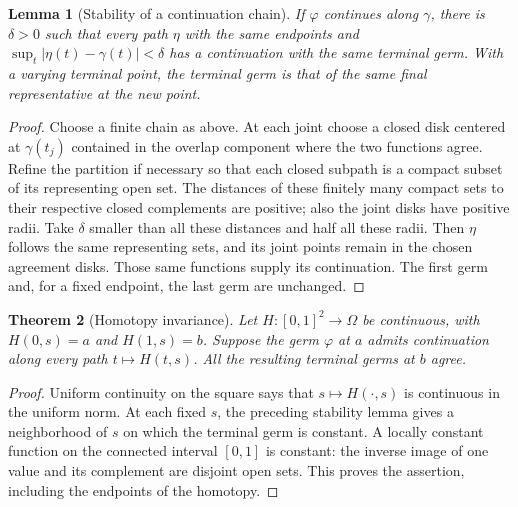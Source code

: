 \documentclass[11pt,a4paper,openany]{book}
\newtheorem{theorem}{Theorem}[chapter]
\newtheorem{lemma}[theorem]{Lemma}
\theoremstyle{definition}
\theoremstyle{remark}\newtheorem{remark}[theorem]{Remark}
\newcommand{\family}[1]{}
\begin{document}
\begin{lemma}[Stability of a continuation chain]\label{d12:19-04}\family{D12.19.04}
If $\varphi$ continues along $\gamma$, there is $\delta>0$ such that every
path $\eta$ with the same endpoints and
$\sup_t|\eta(t)-\gamma(t)|<\delta$ has a continuation with the same
terminal germ. With a varying terminal point, the terminal germ is that
of the same final representative at the new point.
\end{lemma}
\begin{proof}
Choose a finite chain as above. At each joint choose a closed disk centered
at $\gamma(t_j)$ contained in the overlap component where the two functions
agree. Refine the partition if necessary so that each closed subpath is a
compact subset of its representing open set. The distances of these
finitely many compact sets to their respective closed complements are
positive; also the joint disks have positive radii. Take $\delta$ smaller
than all these distances and half all these radii. Then $\eta$ follows
the same representing sets, and its joint points remain in the chosen
agreement disks. Those same functions supply its continuation. The first
germ and, for a fixed endpoint, the last germ are unchanged.
\end{proof}

\begin{theorem}[Homotopy invariance]\label{d12:19-05}\family{D12.19.05}
Let $H:[0,1]^2\to\Omega$ be continuous, with $H(0,s)=a$ and $H(1,s)=b$.
Suppose the germ $\varphi$ at $a$ admits continuation along every path
$t\mapsto H(t,s)$. All the resulting terminal germs at $b$ agree.
\end{theorem}
\begin{proof}
Uniform continuity on the square says that $s\mapsto H(\cdot,s)$ is
continuous in the uniform norm. At each fixed $s$, the preceding stability
lemma gives a neighborhood of $s$ on which the terminal germ is constant.
A locally constant function on the connected interval $[0,1]$ is constant:
the inverse image of one value and its complement are disjoint open sets.
This proves the assertion, including the endpoints of the homotopy.
\end{proof}
\end{document}
